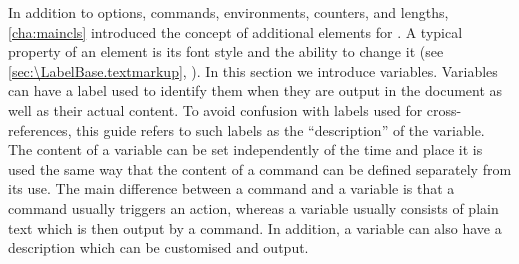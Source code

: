 In addition to options, commands, environments, counters, and lengths,
\autoref{cha:maincls} introduced the concept of additional elements for
\KOMAScript{}. A typical property of an element is its font style and the
ability to change it (see \autoref{sec:\LabelBase.textmarkup},
). In this section we introduce
variables. Variables can have a label used to identify them when they are
output in the document as well as their actual content. To avoid confusion
with labels used for cross-references, this guide refers to such labels as the
``description'' of the variable. The content of a variable can be set
independently of the time and place it is used the same way that the content
of a command can be defined separately from its use. The main difference
between a command and a variable is that a command usually triggers an action,
whereas a variable usually consists of plain text which is then output by a
command. In addition, a variable can also have a description which can be
customised and output.

